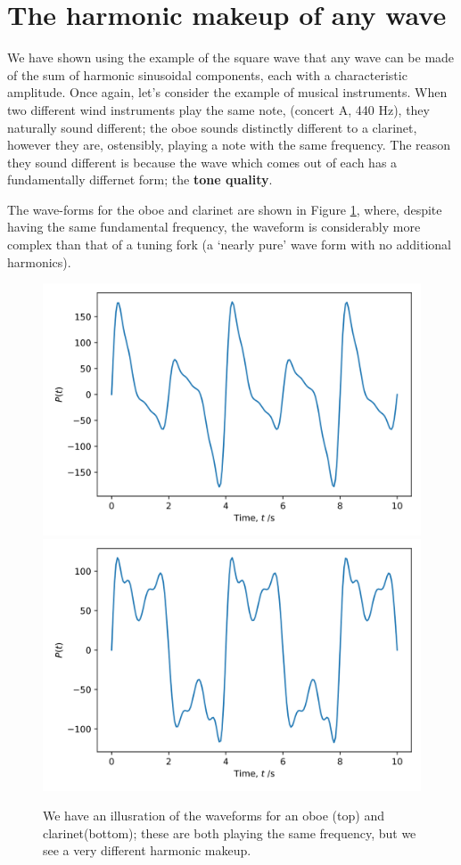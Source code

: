 \documentclass[
]{book}
\begin{document}
\hypertarget{sec:ch11-harmonicwavemakeup1}{%
\section{The harmonic makeup of any wave}\label{sec:ch11-harmonicwavemakeup1}}

We have shown using the example of the square wave that any wave can be made of the sum of harmonic sinusoidal components, each with a characteristic amplitude. Once again, let's consider the example of musical instruments. When two different wind instruments play the same note, (concert A, 440 Hz), they naturally sound different; the oboe sounds distinctly different to a clarinet, however they are, ostensibly, playing a note with the same frequency. The reason they sound different is because the wave which comes out of each has a fundamentally differnet form; the \textbf{tone quality}.

The wave-forms for the oboe and clarinet are shown in Figure \ref{fig:ch11-oboeclarinetwaveform1}, where, despite having the same fundamental frequency, the waveform is considerably more complex than that of a tuning fork (a `nearly pure' wave form with no additional harmonics).

\begin{figure}

{\centering \includegraphics[width=0.7\linewidth]{visualisations/slides-harmonicsum_oboe} \includegraphics[width=0.7\linewidth]{visualisations/slides-harmonicsum_clar} 

}

\caption{We have an illusration of the waveforms for an oboe (top) and clarinet(bottom); these are both playing the same frequency, but we see a very different harmonic makeup.}\label{fig:ch11-oboeclarinetwaveform1}
\end{figure}
\end{document}
